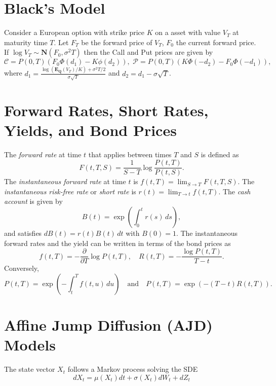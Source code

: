\documentclass[twocolumn]{amsart}
\newcommand{\EQ}{\mathbf{E}_\mathbf{Q}}
\newcommand{\Normal}{\mathbf{N}}
\newcommand{\Call}{\mathcal{C}}
\newcommand{\Put}{\mathcal{P}}
\begin{document}
\section*{Black's Model}

Consider a European option with strike price $K$ on a asset with value $V_T$ at maturity time $T$. Let $F_T$ be the forward price of $V_T$, $F_0$ the current forward price. If $\log V_T \sim \Normal(F_0, \sigma^2 T)$ then the Call and Put prices are given by
\begin{equation*}
\Call = P(0,T) (F_0 \Phi(d_1) - K \phi(d_2)), \,\, \Put = P(0,T) (K \Phi(-d_2) - F_0 \Phi(-d_1)),
\end{equation*}
where $\displaystyle d_1 = \frac{\log(\EQ(V_T)/K) + \sigma^2T/2}{\sigma \sqrt{T}}$ and $d_2 = d_1 - \sigma \sqrt{T}$.

\section*{Forward Rates, Short Rates, Yields, and Bond Prices}

The \emph{forward rate} at time $t$ that applies between times $T$ and $S$ is defined as
\begin{equation*}
    F(t,T,S) = \frac{1}{S-T}\log \frac{P(t,T)}{P(t,S)}.
\end{equation*}
The \emph{instantaneous forward rate} at time $t$ is $f(t,T) = \lim_{S \to T} F(t,T,S)$. The \emph{instantaneous risk-free rate} or \emph{short rate} is $r(t) = \lim_{T \to t} f(t,T)$. The \emph{cash account} is given by
\begin{equation*}
    B(t) = \exp\left(\int_0^t r(s)\,ds\right),
\end{equation*}
and satisfies $dB(t) = r(t) B(t)\,dt$ with $B(0)=1$. The instantaneous forward rates and the yield can be written in terms of the bond prices as
\[ f(t,T) = - \frac{\partial}{\partial T} \log P(t,T), \quad R(t,T) = - \frac{\log P(t,T)}{T-t}. \]
Conversely,
\[ P(t,T) = \exp \left(- \int_t^T f(t,u)\,du \right)\quad \text{and} \quad P(t,T) = \exp(-(T-t)R(t,T)). \]

\section*{Affine Jump Diffusion (AJD) Models}

The state vector $X_t$ follows a Markov process solving the SDE
\begin{equation*}
dX_t=\mu(X_t)dt +\sigma(X_t)dW_t + dZ_t
\end{equation*}
\end{document}
